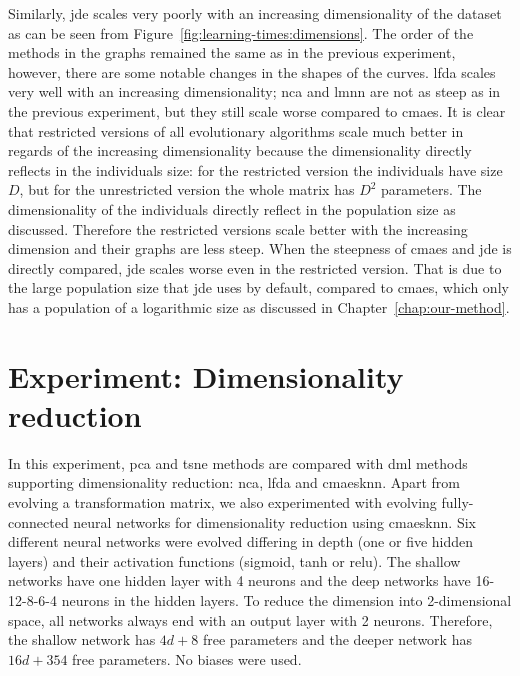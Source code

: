 Similarly, \ac{jde} scales very poorly with an increasing dimensionality of the dataset as can be seen from Figure~\ref{fig:learning-times:dimensions}. The order of the methods in the graphs remained the same as in the previous experiment, however, there are some notable changes in the shapes of the curves. \ac{lfda} scales very well with an increasing dimensionality; \ac{nca} and \ac{lmnn} are not as steep as in the previous experiment, but they still scale worse compared to \ac{cmaes}. It is clear that restricted versions of all evolutionary algorithms scale much better in regards of the increasing dimensionality because the dimensionality directly reflects in the individuals size: for the restricted version the individuals have size $D$, but for the unrestricted version the whole matrix has $D^2$ parameters. The dimensionality of the individuals directly reflect in the population size as discussed. Therefore the restricted versions scale better with the increasing dimension and their graphs are less steep. When the steepness of \ac{cmaes} and \ac{jde} is directly compared, \ac{jde} scales worse even in the restricted version. That is due to the large population size that \ac{jde} uses by default, compared to \ac{cmaes}, which only has a population of a logarithmic size as discussed in Chapter~\ref{chap:our-method}.



\section{Experiment: Dimensionality reduction} \label{chap:exp:dimred}


In this experiment, \ac{pca} and \ac{tsne} methods are compared with \ac{dml} methods supporting dimensionality reduction: \ac{nca}, \ac{lfda} and \ac{cmaesknn}. Apart from evolving a transformation matrix, we also experimented with evolving fully-connected neural networks for dimensionality reduction using \ac{cmaesknn}. Six different neural networks were evolved differing in depth (one or five hidden layers) and their activation functions (sigmoid, \ac{tanh} or \ac{relu}). The shallow networks have one hidden layer with 4 neurons and the deep networks have 16-12-8-6-4 neurons in the hidden layers. To reduce the dimension into 2-dimensional space, all networks always end with an output layer with 2 neurons. Therefore, the shallow network has $4d+8$ free parameters and the deeper network has $16d+354$ free parameters. No biases were used.

